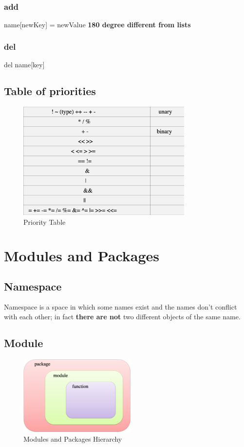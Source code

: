 \documentclass[11pt]{article}
\begin{document}
\subsubsection{add}
\label{sec:org7923401}
name[newKey] = newValue
\textbf{180 degree different from lists}

\subsubsection{del}
\label{sec:orga3fdd3f}
del name[key]


\newpage
\subsection{Table of priorities}
\label{sec:org8254b0e}

\begin{figure}[htbp]
\centering
\includegraphics[width=330px]{./images/priorities.png}
\caption{Priority Table}
\end{figure}

\newpage
\section{Modules and Packages}
\label{sec:orgdd9bcbb}
\subsection{Namespace}
\label{sec:orgf9fad61}
Namespace is a space in which some names exist and the names don’t
conflict with each other; in fact \textbf{there are not} two different objects of the
same name.
\subsection{Module}
\label{sec:orgda8b2fa}

\begin{figure}[htbp]
\centering
\includegraphics[width=220px]{./images/moduleHierarchy.png}
\caption{Modules and Packages Hierarchy}
\end{figure}
\end{document}
